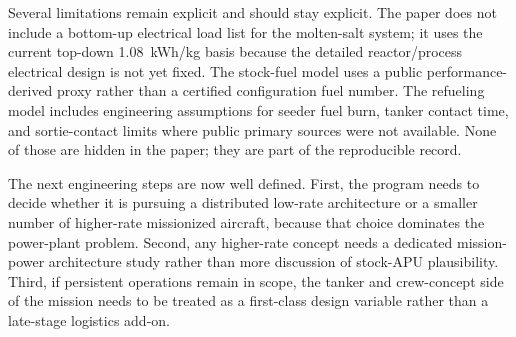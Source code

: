 \documentclass[8pt,twocolumn]{extarticle}
\begin{document}
\vspace{0.25em}
Several limitations remain explicit and should stay explicit. The paper does not include a bottom-up electrical load list for the molten-salt system; it uses the current top-down \SI{1.08}{kWh/kg} basis because the detailed reactor/process electrical design is not yet fixed. The stock-fuel model uses a public performance-derived proxy rather than a certified configuration fuel number. The refueling model includes engineering assumptions for seeder fuel burn, tanker contact time, and sortie-contact limits where public primary sources were not available. None of those are hidden in the paper; they are part of the reproducible record.

\vspace{0.25em}
The next engineering steps are now well defined. First, the program needs to decide whether it is pursuing a distributed low-rate architecture or a smaller number of higher-rate missionized aircraft, because that choice dominates the power-plant problem. Second, any higher-rate concept needs a dedicated mission-power architecture study rather than more discussion of stock-APU plausibility. Third, if persistent operations remain in scope, the tanker and crew-concept side of the mission needs to be treated as a first-class design variable rather than a late-stage logistics add-on.
\end{document}
